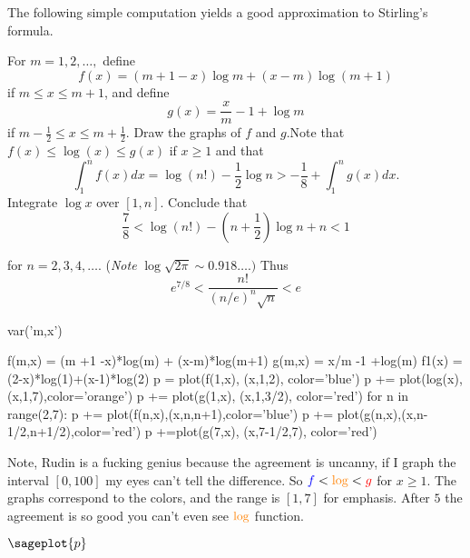 \documentclass{article}
\begin{document}
The following simple computation yields a good approximation to
Stirling's formula.

For $m =1,2,\dots,$ define
\[f(x) = (m+1-x)\log m +(x-m)\log (m+1)\]
if $m \leq x \leq m+1$, and define
\[g(x) = \frac{x}{m} -1 + \log m\]
if $m-\frac{1}{2} \leq x\leq m+\frac{1}{2}$. Draw the graphs of $f$
and $g$.Note that $f(x)\leq \log(x)\leq g(x)$ if $x \geq 1$ and that
\[\int_1^n f(x) dx = \log(n!) -\frac{1}{2}\log n > -\frac{1}{8} +
  \int_{1}^n g(x) dx\text{.}\]
Integrate $\log x$ over $[1,n].$ Conclude that
\[\frac{7}{8}<\log (n!) -(n+\frac{1}{2})\log n +n < 1\]

for $n = 2,3,4,\dots.$ (\textit{Note} $\log \sqrt{2\pi} \sim
0.918\dots.)$ Thus
\[e^{7/8}<\frac{ n!}{(n/e)^n\sqrt{n}} < e\]

\begin{sagesilent}
  var('m,x')

  f(m,x) = (m +1 -x)*log(m) + (x-m)*log(m+1)
  g(m,x) = x/m -1 +log(m)
  f1(x) = (2-x)*log(1)+(x-1)*log(2)
  p = plot(f(1,x), (x,1,2), color='blue')
  p += plot(log(x),(x,1,7),color='orange')
  p += plot(g(1,x), (x,1,3/2), color='red')
  for n in range(2,7):
      p += plot(f(n,x),(x,n,n+1),color='blue')
      p += plot(g(n,x),(x,n-1/2,n+1/2),color='red')
  p +=plot(g(7,x), (x,7-1/2,7), color='red')
\end{sagesilent}

Note, Rudin is a fucking genius because the agreement is uncanny, if
I graph the interval $[0,100]$ my eyes can't tell the difference. So
$\color{blue}f\color{black}<\color{orange}\log\color{black}<\color{red}g$
for $x\geq1$. The
graphs correspond to the colors, and the range is $[1,7]$ for
emphasis. After $5$ the agreement is so good you can't even see
$\color{orange}\log\color{black}$ function.


$\sageplot{p}$
\end{document}
